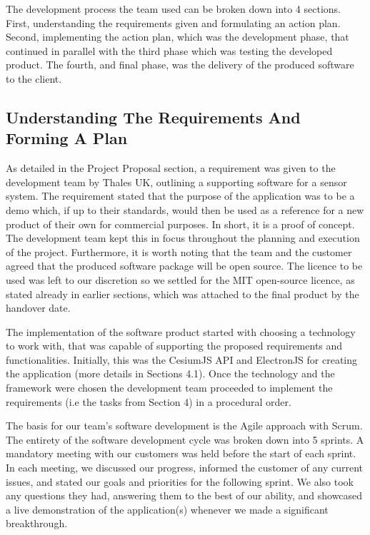 \documentclass{l3proj}
\begin{document}
The development process the team used can be broken down into 4 sections. First, understanding the requirements given and formulating an action plan. Second, implementing the action plan, which was the development phase, that continued in parallel with the third phase which was testing the developed product. The fourth, and final phase, was the delivery of the produced software to the client.

\subsection{Understanding The Requirements And Forming A Plan}

As detailed in the Project Proposal section, a requirement was given to the development team by Thales UK, outlining a supporting software for a sensor system. The requirement stated that the purpose of the application was to be a demo which, if up to their standards, would then be used as a reference for a new product of their own for commercial purposes. In short, it is a proof of concept. The development team kept this in focus throughout the planning and execution of the project. Furthermore, it is worth noting that the team and the customer agreed that the produced software package will be open source. The licence to be used was left to our discretion so we settled for the MIT open-source licence, as stated already in earlier sections, which was attached to the final product by the handover date. 
  
The implementation of the software product started with choosing a technology to work with, that was capable of supporting the proposed requirements and functionalities. Initially, this was the CesiumJS API and ElectronJS for creating the application (more details in Sections 4.1). Once the technology and the framework were chosen the development team proceeded to implement the requirements (i.e the tasks from Section 4) in a procedural order.

The basis for our team’s software development is the Agile\cite{agile} approach with Scrum\cite{scrum}. The entirety of the software development cycle was broken down into 5 sprints. A mandatory meeting with our customers was held before the start of each sprint. In each meeting, we discussed our progress, informed the customer of any current issues, and stated our goals and priorities for the following sprint. We also took any questions they had, answering them to the best of our ability, and showcased a live demonstration of the application(s) whenever we made a significant breakthrough.
 
\end{document}
